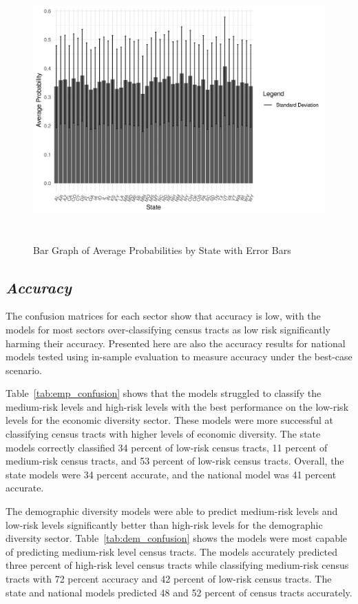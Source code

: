\begin{figure}[htbp]
    \centering
     \includegraphics[width=1\textwidth, height=10cm]{plots/prob_state.png}
     \caption{Bar Graph of Average Probabilities by State with Error Bars}
     \label{fig:prob_sector}
 \end{figure}

 \pagebreak

\subsection{\textit{Accuracy}}
The confusion matrices for each sector show that accuracy is low, with the models for most sectors over-classifying census tracts as low risk significantly harming their accuracy. Presented here are also the accuracy results for national models tested using in-sample evaluation to measure accuracy under the best-case scenario. 

Table~\ref{tab:emp_confusion} shows that the models struggled to classify the medium-risk levels and high-risk levels with the best performance on the low-risk levels for the economic diversity sector. These models were more successful at classifying census tracts with higher levels of economic diversity. The state models correctly classified 34 percent of low-risk census tracts, 11 percent of medium-risk census tracts, and 53 percent of low-risk census tracts. Overall, the state models were 34 percent accurate, and the national model was 41 percent accurate. 

 


The demographic diversity models were able to predict medium-risk levels and low-risk levels significantly better than high-risk levels for the demographic diversity sector.  Table~\ref{tab:dem_confusion} shows the models were most capable of predicting medium-risk level census tracts. The models accurately predicted three percent of high-risk level census tracts while classifying medium-risk census tracts with 72 percent accuracy and 42 percent of low-risk census tracts. The state and national models predicted 48 and 52 percent of census tracts accurately. 


